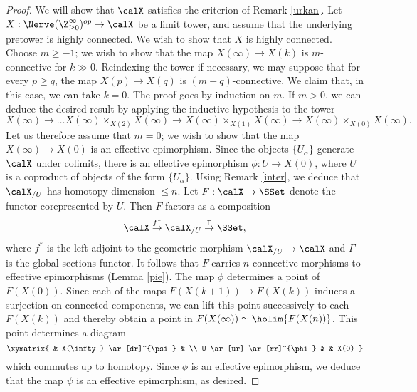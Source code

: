 \begin{proof}
We will show that $\calX$ satisfies the criterion of Remark \ref{urkan}. Let $X: \Nerve( \Z^{\infty}_{\geq 0} )^{op} \rightarrow \calX$ be a limit tower, and assume that the underlying pretower is highly connected. We wish to show that $X$ is highly connected. Choose $m \geq -1$; we wish to show that the map $X(\infty) \rightarrow X(k)$ is $m$-connective for $k \gg 0$.
Reindexing the tower if necessary, we may suppose that for every $p \geq q$, the map
$X(p) \rightarrow X(q)$ is $(m+q)$-connective. We claim that, in this case, we can take $k = 0$. 
The proof goes by induction on $m$. If $m > 0$, we can deduce the desired result by applying the inductive hypothesis to the tower
$$ X(\infty) \rightarrow \ldots X(\infty) \times_{ X(2) } X(\infty) \rightarrow X(\infty) \times_{ X(1) } X(\infty)
\rightarrow X(\infty) \times_{ X(0) } X(\infty). $$
Let us therefore assume that $m = 0$; we wish to show that the map $X(\infty) \rightarrow X(0)$ is an effective epimorphism. Since the objects $\{ U_{\alpha} \}$ generate $\calX$ under colimits, there
is an effective epimorphism $\phi: U \rightarrow X(0)$, where $U$ is a coproduct of objects of the form
$\{ U_{\alpha} \}$. Using Remark \ref{inter}, we deduce that $\calX_{/U}$ has homotopy dimension $\leq n$. Let $F: \calX \rightarrow \SSet$ denote the functor corepresented by $U$. Then
$F$ factors as a composition
$$ \calX \stackrel{f^{\ast}}{\rightarrow} \calX_{/U} \stackrel{\Gamma}{\rightarrow} \SSet,$$
where $f^{\ast}$ is the left adjoint to the geometric morphism $\calX_{/U} \rightarrow \calX$
and $\Gamma$ is the global sections functor. It follows that $F$ carries $n$-connective morphisms to effective epimorphisms (Lemma \ref{pie}). The map $\phi$ determines a point of
$F( X(0) )$. Since each of the maps $F( X(k+1)  ) \rightarrow F( X(k) )$ induces a surjection on
connected components, we can lift this point successively to each $F( X(k) )$ and thereby obtain
a point in $F( X(\infty) ) \simeq \holim \{ F( X(n) ) \}$. This point determines a diagram
$$ \xymatrix{ & X(\infty) \ar[dr]^{\psi} & \\
U \ar[ur] \ar[rr]^{\phi} & & X(0) }$$
which commutes up to homotopy. Since $\phi$ is an effective epimorphism, we deduce that
the map $\psi$ is an effective epimorphism, as desired.
\end{proof}


